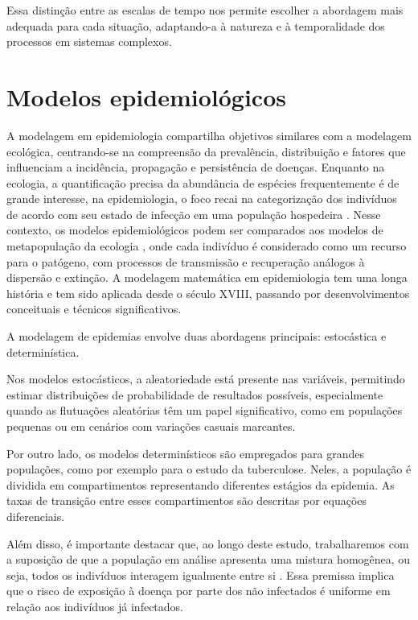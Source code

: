 Essa distinção entre as escalas de tempo nos permite escolher a abordagem mais adequada para cada situação, adaptando-a à natureza e à temporalidade dos processos em sistemas complexos.

\section{Modelos epidemiológicos}

A modelagem em epidemiologia compartilha objetivos similares com a modelagem ecológica, centrando-se na compreensão da prevalência, distribuição e fatores que influenciam a incidência, propagação e persistência de doenças. Enquanto na ecologia, a quantificação precisa da abundância de espécies frequentemente é de grande interesse, na epidemiologia, o foco recai na categorização dos indivíduos de acordo com seu estado de infecção em uma população hospedeira \cite{Matt2008}. Nesse contexto, os modelos epidemiológicos podem ser comparados aos modelos de metapopulação da ecologia \cite{macarthur1967theory, levins1969demographic}, onde cada indivíduo é considerado como um recurso para o patógeno, com processos de transmissão e recuperação análogos à dispersão e extinção. A modelagem matemática em epidemiologia tem uma longa história e tem sido aplicada desde o século XVIII, passando por desenvolvimentos conceituais e técnicos significativos.

A modelagem de epidemias envolve duas abordagens principais: estocástica e determinística.

Nos modelos estocásticos, a aleatoriedade está presente nas variáveis, permitindo estimar distribuições de probabilidade de resultados possíveis, especialmente quando as flutuações aleatórias têm um papel significativo, como em populações pequenas ou em cenários com variações casuais marcantes.

Por outro lado, os modelos determinísticos são empregados para grandes populações, como por exemplo para o estudo da tuberculose. Neles, a população é dividida em compartimentos representando diferentes estágios da epidemia. As taxas de transição entre esses compartimentos são descritas por equações diferenciais.

Além disso, é importante destacar que, ao longo deste estudo, trabalharemos com a suposição de que a população em análise apresenta uma mistura homogênea, ou seja, todos os indivíduos interagem igualmente entre si \cite{allman_rhodes_2003}. Essa premissa implica que o risco de exposição à doença por parte dos não infectados é uniforme em relação aos indivíduos já infectados.

